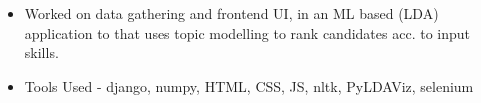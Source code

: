 
\begin{itemize}
\item Worked on data gathering and frontend UI, in an ML based (LDA) application to that uses topic modelling to rank candidates acc. to input skills.
\item Tools Used -  django, numpy, HTML, CSS, JS, nltk, PyLDAViz, selenium
\end{itemize}




